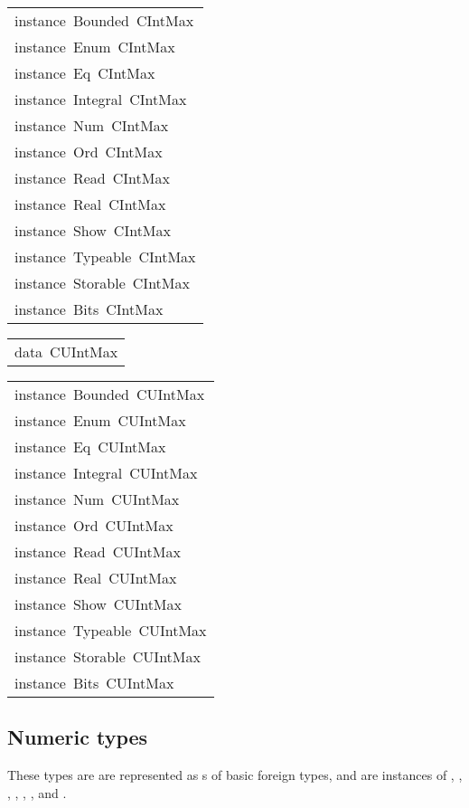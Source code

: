 \begin{haddockdesc}
\item[\begin{tabular}{@{}l}
instance\ Bounded\ CIntMax\\instance\ Enum\ CIntMax\\instance\ Eq\ CIntMax\\instance\ Integral\ CIntMax\\instance\ Num\ CIntMax\\instance\ Ord\ CIntMax\\instance\ Read\ CIntMax\\instance\ Real\ CIntMax\\instance\ Show\ CIntMax\\instance\ Typeable\ CIntMax\\instance\ Storable\ CIntMax\\instance\ Bits\ CIntMax
\end{tabular}]
\end{haddockdesc}
\begin{haddockdesc}
\item[\begin{tabular}{@{}l}
data\ CUIntMax
\end{tabular}]
\end{haddockdesc}
\begin{haddockdesc}
\item[\begin{tabular}{@{}l}
instance\ Bounded\ CUIntMax\\instance\ Enum\ CUIntMax\\instance\ Eq\ CUIntMax\\instance\ Integral\ CUIntMax\\instance\ Num\ CUIntMax\\instance\ Ord\ CUIntMax\\instance\ Read\ CUIntMax\\instance\ Real\ CUIntMax\\instance\ Show\ CUIntMax\\instance\ Typeable\ CUIntMax\\instance\ Storable\ CUIntMax\\instance\ Bits\ CUIntMax
\end{tabular}]
\end{haddockdesc}
\subsection{Numeric types
}
These types are are represented as s of basic
 foreign types, and are instances of
 , , , ,
 , ,  and .
\par

